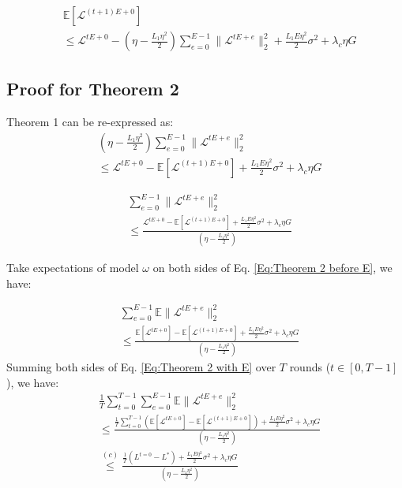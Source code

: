 \begin{align}
    &\mathbb{E}\left[\mathcal{L}^{(t+1)E+0}\right] \\
    & \le \mathcal{L}^{tE+0} - \left(\eta - \frac{L_1 \eta^2}{2}\right) \sum_{e=0}^{E-1} \|\mathcal{L}^{tE+e}\|_2^2 + \frac{L_1 E \eta^2}{2} \sigma^2 + \lambda_c \eta G
\end{align}

\subsection{Proof for Theorem 2}
Theorem 1 can be re-expressed as:
\begin{align}
     &\left(\eta - \frac{L_1 \eta^2}{2}\right) \sum_{e=0}^{E-1} \|\mathcal{L}^{tE+e}\|_2^2 \\ 
     &\le \mathcal{L}^{tE+0} - \mathbb{E}\left[\mathcal{L}^{(t+1)E+0}\right] + \frac{L_1 E \eta^2}{2} \sigma^2 + \lambda_c \eta G
\end{align}

\begin{align}
     &\sum_{e=0}^{E-1} \|\mathcal{L}^{tE+e}\|_2^2 \\ 
      &\le \frac{\mathcal{L}^{tE+0} - \mathbb{E}\left[\mathcal{L}^{(t+1)E+0}\right] + \frac{L_1 E \eta^2}{2} \sigma^2 + \lambda_c \eta G}{\left(\eta - \frac{L_1 \eta^2}{2}\right)}
    \label{Eq:Theorem 2 before E}
\end{align}

Take expectations of model $\omega$ on both sides of Eq. \ref{Eq:Theorem 2 before E}, we have:

\begin{align}
     &\sum_{e=0}^{E-1} \mathbb{E}\|\mathcal{L}^{tE+e}\|_2^2 \\  & \le\frac{\mathbb{E}[\mathcal{L}^{tE+0}] - \mathbb{E}\left[\mathcal{L}^{(t+1)E+0}\right] + \frac{L_1 E \eta^2}{2} \sigma^2 + \lambda_c \eta G}{\left(\eta - \frac{L_1 \eta^2}{2}\right)}
    \label{Eq:Theorem 2 with E}
\end{align}
Summing both sides of Eq. \ref{Eq:Theorem 2 with E} over $T$ rounds ($t \in [0, T - 1]$), we have:
\begin{align}
     &\frac{1}{T}\sum_{t=0}^{T-1} \sum_{e=0}^{E-1} \mathbb{E}\|\mathcal{L}^{tE+e}\|_2^2 \\
     & \le \frac{\frac{1}{T}\sum_{t=0}^{T-1}(\mathbb{E}[\mathcal{L}^{tE+0}] - \mathbb{E}\left[\mathcal{L}^{(t+1)E+0}\right]) + \frac{L_1 E \eta^2}{2} \sigma^2 + \lambda_c \eta G}{\left(\eta - \frac{L_1 \eta^2}{2}\right)} \\
    & \stackrel{(c)}{\le} \frac{\frac{1}{T}(L^{t = 0} - L^*) + \frac{L_1 E \eta^2}{2} \sigma^2 + \lambda_c \eta G}{\left(\eta - \frac{L_1 \eta^2}{2}\right)} 
\end{align}

